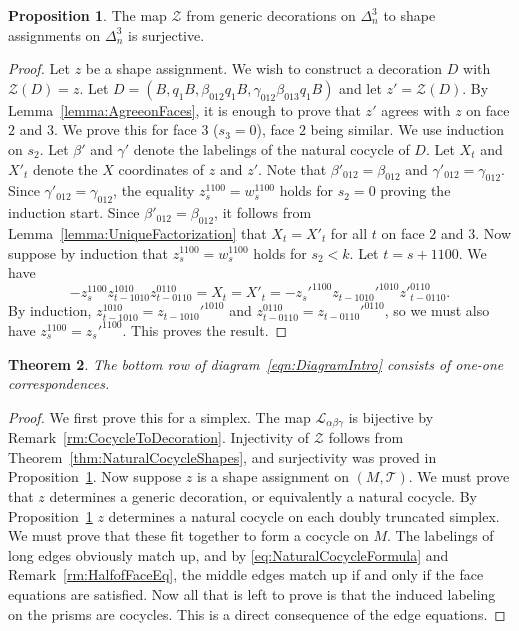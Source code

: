 \documentclass[12pt]{amsart}
\newtheorem{theorem}{Theorem}[section]
\theoremstyle{definition}
\newtheorem{proposition}[theorem]{Proposition}
\numberwithin{equation}{section}
\def\T{\mathcal{T}}
\begin{document}
\begin{proposition}\label{prop:ZisSurjective}
The map $\mathcal Z$ from generic decorations on $\Delta^3_n$ to shape assignments on $\Delta^3_n$ is surjective.
\end{proposition}

\begin{proof}
Let $z$ be a shape assignment. We wish to construct a decoration $D$ with $\mathcal Z(D)=z$. Let $D=(B, q_1B, \beta_{012} q_1 B, \gamma_{012} \beta_{013} q_1 B)$ and let $z'=\mathcal Z(D)$. By Lemma~\ref{lemma:AgreeonFaces}, it is enough to prove that $z'$ agrees with $z$ on face $2$ and $3$. 
We prove this for face $3$ ($s_3=0$), face $2$ being similar. We use induction on $s_2$. Let $\beta'$ and $\gamma'$ denote the labelings of the natural cocycle of $D$. Let $X_t$ and $X'_t$ denote the $X$ coordinates of $z$ and $z'$. Note that $\beta'_{012}=\beta_{012}$ and $\gamma'_{012}=\gamma_{012}$. Since $\gamma'_{012}=\gamma_{012}$, the equality $z_s^{1100}=w_s^{1100}$ holds for $s_2=0$ proving the induction start. Since $\beta'_{012}=\beta_{012}$, it follows from 
Lemma~\ref{lemma:UniqueFactorization} that $X_t=X'_t$ for all $t$ on face $2$ and $3$.
Now suppose by induction that $z_s^{1100}=w_s^{1100}$ holds for $s_2<k$. Let $t=s+1100$.  
We have
\begin{equation}
-z_s^{1100}z_{t-1010}^{1010}z^{0110}_{t-0110}=X_t=X'_t=-z_s'^{1100}z_{t-1010}'^{1010}z'^{0110}_{t-0110}.
\end{equation}
By induction, $z_{t-1010}^{1010}=z_{t-1010}'^{1010}$ and $z_{t-0110}^{0110}=z_{t-0110}'^{0110}$, so we must also have
$z_s^{1100}=z_s'^{1100}$. This proves the result.
\end{proof}


\begin{theorem}\label{thm:One-One}
The bottom row of diagram~\eqref{eqn:DiagramIntro} consists of one-one correspondences. 
\end{theorem}

\begin{proof}
We first prove this for a simplex. The map $\mathcal L_{\alpha\beta\gamma}$ is bijective by Remark~\ref{rm:CocycleToDecoration}. Injectivity of $\mathcal Z$ follows from Theorem~\ref{thm:NaturalCocycleShapes}, and surjectivity was proved in Proposition~\ref{prop:ZisSurjective}. Now suppose $z$ is a shape assignment on $(M,\T)$. We must prove that $z$ determines a generic decoration, or equivalently a natural cocycle. By Proposition~\ref{prop:ZisSurjective} $z$ determines a natural cocycle on each doubly truncated simplex. We must prove that these fit together to form a cocycle on $M$. The labelings of long edges obviously match up, and by \eqref{eq:NaturalCocycleFormula} and Remark~\ref{rm:HalfofFaceEq}, the middle edges match up if and only if the face equations are satisfied. 
Now all that is left to prove is that the induced labeling on the prisms are cocycles. This is a direct consequence of the edge equations.
\end{proof}
\end{document}
